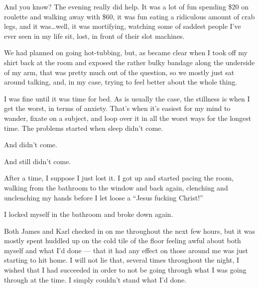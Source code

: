And you know? The evening really did help. It was a lot of fun spending \$20 on roulette and walking away with \$60, it was fun eating a ridiculous amount of crab legs, and it was\ldots{}well, it was mortifying, watching some of saddest people I've ever seen in my life sit, lost, in front of their slot machines.

We had planned on going hot-tubbing, but, as became clear when I took off my shirt back at the room and exposed the rather bulky bandage along the underside of my arm, that was pretty much out of the question, so we mostly just sat around talking, and, in my case, trying to feel better about the whole thing.

I was fine until it was time for bed. As is usually the case, the stillness is when I get the worst, in terms of anxiety. That's when it's easiest for my mind to wander, fixate on a subject, and loop over it in all the worst ways for the longest time. The problems started when sleep didn't come.

And didn't come.

And still didn't come.

After a time, I suppose I just lost it. I got up and started pacing the room, walking from the bathroom to the window and back again, clenching and unclenching my hands before I let loose a ``Jesus fucking Christ!''

I locked myself in the bathroom and broke down again.

Both James and Karl checked in on me throughout the next few hours, but it was mostly spent huddled up on the cold tile of the floor feeling awful about both myself and what I'd done --- that it had any effect on those around me was just starting to hit home. I will not lie that, several times throughout the night, I wished that I had succeeded in order to not be going through what I was going through at the time. I simply couldn't stand what I'd done.
